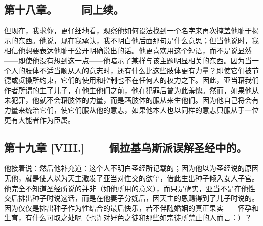 
\subsection{第十八章。——同上续。}

但现在，我求你，更仔细地看，观察他如何设法找到一个名字来再次掩盖他耻于揭示的东西。他说，现在我承认，我不明白他后面那句是什么意思；但当他说时，我相信他想要表达他耻于公开明确说出的话。他更喜欢用这个短语，而不是说显然——即使他没有想到这一点——他暗示了某样与该主题明显相关的东西。因为当一个人的肢体不适当顺从人的意志时，还有什么比这些肢体更有力量？即使它们被节德或贞操所约束，它们的使用和控制也不在任何人的权力之下。因此，亚当藉我们作者所谓的生了儿子，在他生他们之前，他在犯罪后曾为此羞愧。然而，如果他从未犯罪，他就不会藉肢体的力量，而是藉肢体的服从来生他们。因为他自己将会有力量来统治它们，使它们服从他的意志，如果他本人也以同样的意志只服从于一位更有大能者作为臣属。\par


\subsection{第十九章 [VIII.]——佩拉基乌斯派误解圣经中的。}

他接着说：然后他补充道：这个人不明白圣经所记载的；因为他以为圣经说的原因无他，就是使人以为天主激发了亚当对性交的欲望，借此生出种子倾入女人子宫。他完全不知道圣经所说的并非（如他所用的意义），而只是确实，亚当不是在他性交后排出种子时说这话，而是在他妻子分娩后，因天主的恩赐得到了儿子时说的。因为仅仅是排出种子作为性结合的最后快乐，若不伴随婚姻的真正果实——怀孕和生育，有什么可取之处呢（也许对好色之徒和那些如宗徒所禁止的人而言：）？\par


